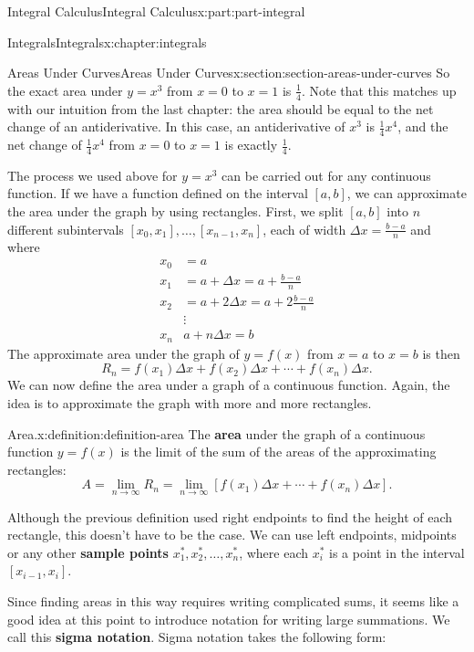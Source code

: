 \documentclass[twoside,10pt,]{book}
\newcommand{\terminology}[1]{\textbf{#1}}
\numberwithin{equation}{part}
\begin{document}
\begin{partptx}{Integral Calculus}{}{Integral Calculus}{}{}{x:part:part-integral}
\begin{chapterptx}{Integrals}{}{Integrals}{}{}{x:chapter:integrals}
\begin{sectionptx}{Areas Under Curves}{}{Areas Under Curves}{}{}{x:section:section-areas-under-curves}
So the exact area under \(y = x^{3}\) from \(x=0\) to \(x=1\) is \(\frac{1}{4}\). Note that this matches up with our intuition from the last chapter: the area should be equal to the net change of an antiderivative. In this case, an antiderivative of \(x^{3}\) is \(\frac{1}{4}x^{4}\), and the net change of \(\frac{1}{4}x^{4}\) from \(x=0\) to \(x=1\) is exactly \(\frac{1}{4}\).%
\par
The process we used above for \(y = x^{3}\) can be carried out for any continuous function. If we have a function defined on the interval \([a,b]\), we can approximate the area under the graph by using rectangles. First, we split \([a,b]\) into \(n\) different subintervals \([x_{0},x_{1}],\ldots,[x_{n-1},x_{n}]\), each of width \(\Delta x = \frac{b-a}{n}\) and where%
\begin{align*}
x_{0} & = a \\
x_{1} & = a + \Delta x = a+\frac{b-a}{n} \\
x_{2} & = a + 2\Delta x = a + 2\frac{b-a}{n}\\
& \vdots \\
x_{n} & a+n\Delta x = b
\end{align*}
The approximate area under the graph of \(y=f(x)\) from \(x=a\) to \(x=b\) is then%
\begin{equation*}
R_{n} = f(x_{1})\Delta x + f(x_{2})\Delta x + \cdots + f(x_{n})\Delta x.
\end{equation*}
We can now define the area under a graph of a continuous function. Again, the idea is to approximate the graph with more and more rectangles.%
\begin{definition}{Area.}{x:definition:definition-area}%
The \terminology{area} under the graph of a continuous function \(y=f(x)\) is the limit of the sum of the areas of the approximating rectangles:%
\begin{equation*}
A = \lim_{n\to\infty}R_{n} = \lim_{n\to\infty}[f(x_{1})\Delta x + \cdots + f(x_{n})\Delta x].
\end{equation*}
%
\end{definition}
Although the previous definition used right endpoints to find the height of each rectangle, this doesn't have to be the case. We can use left endpoints, midpoints or any other \terminology{sample points} \(x_{1}^{*}, x_{2}^{*},\ldots,x_{n}^{*}\), where each \(x_{i}^{*}\) is a point in the interval \([x_{i-1},x_{i}].\)%
\par
Since finding areas in this way requires writing complicated sums, it seems like a good idea at this point to introduce notation for writing large summations. We call this \terminology{sigma notation}. Sigma notation takes the following form:%

\end{sectionptx}
\end{chapterptx}
\end{partptx}
\end{document}
